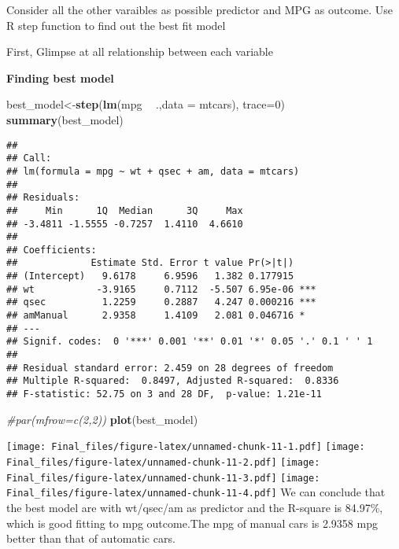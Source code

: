\documentclass[]{article}
\newenvironment{Shaded}{\begin{snugshade}}{\end{snugshade}}
\newcommand{\KeywordTok}[1]{\textcolor[rgb]{0.13,0.29,0.53}{\textbf{#1}}}
\newcommand{\DataTypeTok}[1]{\textcolor[rgb]{0.13,0.29,0.53}{#1}}
\newcommand{\DecValTok}[1]{\textcolor[rgb]{0.00,0.00,0.81}{#1}}
\newcommand{\StringTok}[1]{\textcolor[rgb]{0.31,0.60,0.02}{#1}}
\newcommand{\CommentTok}[1]{\textcolor[rgb]{0.56,0.35,0.01}{\textit{#1}}}
\newcommand{\OperatorTok}[1]{\textcolor[rgb]{0.81,0.36,0.00}{\textbf{#1}}}
\newcommand{\NormalTok}[1]{#1}
\begin{document}
Consider all the other varaibles as possible predictor and MPG as
outcome. Use R step function to find out the best fit model

First, Glimpse at all relationship between each variable

\textbf{Finding best model}

\begin{Shaded}
\begin{Highlighting}[]
\NormalTok{best_model<-}\KeywordTok{step}\NormalTok{(}\KeywordTok{lm}\NormalTok{(mpg }\OperatorTok{~}\StringTok{ }\NormalTok{.,}\DataTypeTok{data =}\NormalTok{ mtcars), }\DataTypeTok{trace=}\DecValTok{0}\NormalTok{)}
\KeywordTok{summary}\NormalTok{(best_model)}
\end{Highlighting}
\end{Shaded}

\begin{verbatim}
## 
## Call:
## lm(formula = mpg ~ wt + qsec + am, data = mtcars)
## 
## Residuals:
##     Min      1Q  Median      3Q     Max 
## -3.4811 -1.5555 -0.7257  1.4110  4.6610 
## 
## Coefficients:
##             Estimate Std. Error t value Pr(>|t|)    
## (Intercept)   9.6178     6.9596   1.382 0.177915    
## wt           -3.9165     0.7112  -5.507 6.95e-06 ***
## qsec          1.2259     0.2887   4.247 0.000216 ***
## amManual      2.9358     1.4109   2.081 0.046716 *  
## ---
## Signif. codes:  0 '***' 0.001 '**' 0.01 '*' 0.05 '.' 0.1 ' ' 1
## 
## Residual standard error: 2.459 on 28 degrees of freedom
## Multiple R-squared:  0.8497, Adjusted R-squared:  0.8336 
## F-statistic: 52.75 on 3 and 28 DF,  p-value: 1.21e-11
\end{verbatim}

\begin{Shaded}
\begin{Highlighting}[]
\CommentTok{#par(mfrow=c(2,2))}
\KeywordTok{plot}\NormalTok{(best_model)}
\end{Highlighting}
\end{Shaded}

\texttt{[image: Final\_files/figure-latex/unnamed-chunk-11-1.pdf]}
\texttt{[image: Final\_files/figure-latex/unnamed-chunk-11-2.pdf]}
\texttt{[image: Final\_files/figure-latex/unnamed-chunk-11-3.pdf]}
\texttt{[image: Final\_files/figure-latex/unnamed-chunk-11-4.pdf]} We can
conclude that the best model are with wt/qsec/am as predictor and the
R-square is 84.97\%, which is good fitting to mpg outcome.The mpg of
manual cars is 2.9358 mpg better than that of automatic cars.
\end{document}
